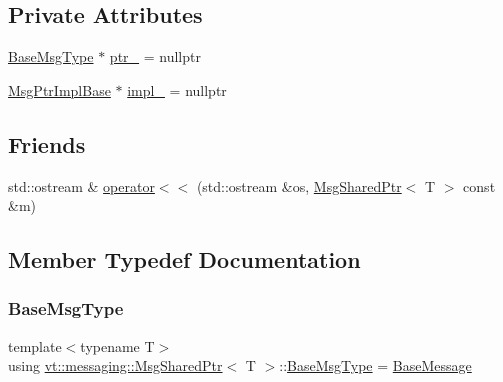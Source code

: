 \subsection*{Private Attributes}
\begin{DoxyCompactItemize}
\item 
\hyperlink{structvt_1_1messaging_1_1_msg_shared_ptr_a778cb9ec8919e4a309d28ed345ac318d}{Base\+Msg\+Type} $\ast$ \hyperlink{structvt_1_1messaging_1_1_msg_shared_ptr_aac5218a8b39004946a523ac4a729a3da}{ptr\+\_\+} = nullptr
\item 
\hyperlink{structvt_1_1messaging_1_1_msg_ptr_impl_base}{Msg\+Ptr\+Impl\+Base} $\ast$ \hyperlink{structvt_1_1messaging_1_1_msg_shared_ptr_aa0cf96203c13d77d691888c852bc333e}{impl\+\_\+} = nullptr
\end{DoxyCompactItemize}
\subsection*{Friends}
\begin{DoxyCompactItemize}
\item 
std\+::ostream \& \hyperlink{structvt_1_1messaging_1_1_msg_shared_ptr_ac412f09ec806f5915ea4a94f3e84d5f4}{operator$<$$<$} (std\+::ostream \&os, \hyperlink{structvt_1_1messaging_1_1_msg_shared_ptr}{Msg\+Shared\+Ptr}$<$ T $>$ const \&m)
\end{DoxyCompactItemize}


\subsection{Member Typedef Documentation}
\mbox{\label{structvt_1_1messaging_1_1_msg_shared_ptr_a778cb9ec8919e4a309d28ed345ac318d}} 
\subsubsection{\texorpdfstring{Base\+Msg\+Type}{BaseMsgType}}
{\footnotesize\ttfamily template$<$typename T$>$ \\
using \hyperlink{structvt_1_1messaging_1_1_msg_shared_ptr}{vt\+::messaging\+::\+Msg\+Shared\+Ptr}$<$ T $>$\+::\hyperlink{structvt_1_1messaging_1_1_msg_shared_ptr_a778cb9ec8919e4a309d28ed345ac318d}{Base\+Msg\+Type} =  \hyperlink{namespacevt_ac34f95a5e2b8109b55bfba52b074443d}{Base\+Message}}

